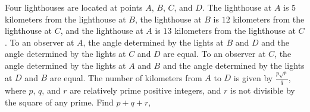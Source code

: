 Four lighthouses are located at points $ A$, $ B$, $ C$, and $ D$. The lighthouse at $ A$ is $ 5$ kilometers from the lighthouse at $ B$, the lighthouse at $ B$ is $ 12$ kilometers from the lighthouse at $ C$, and the lighthouse at $ A$ is $ 13$ kilometers from the lighthouse at $ C$. To an observer at $ A$, the angle determined by the lights at $ B$ and $ D$ and the angle determined by the lights at $ C$ and $ D$ are equal. To an observer at $ C$, the angle determined by the lights at $ A$ and $ B$ and the angle determined by the lights at $ D$ and $ B$ are equal. The number of kilometers from $ A$ to $ D$ is given by $ \displaystyle\frac{p\sqrt{r}}{q}$, where $ p$, $ q$, and $ r$ are relatively prime positive integers, and $ r$ is not divisible by the square of any prime. Find $ p+q+r$,